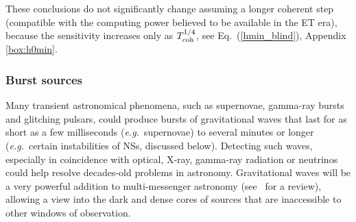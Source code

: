 These conclusions do not significantly change assuming a
longer coherent step (compatible with the computing power believed to be
available in the ET era), because the sensitivity increases only as
$T_{\rm coh}^{1/4}$, see Eq.~(\ref{hmin_blind}), Appendix \ref{box:h0min}.




\FloatBarrier

\subsubsection{Burst sources}
Many transient astronomical phenomena, such as supernovae, gamma-ray
bursts and glitching pulsars, could produce bursts of gravitational 
waves that last for as short as a few milliseconds (\emph{e.g.}\ supernovae)
to several minutes or longer (\emph{e.g.}\ certain instabilities of NSs, 
discussed below). Detecting such waves, especially in coincidence with optical, 
X-ray, gamma-ray radiation or neutrinos could help resolve decades-old 
problems in astronomy. Gravitational waves will be a very powerful 
addition to multi-messenger astronomy (see~\cite{springerlink:10.1007/s10714-010-1019-z} for a review),  allowing a view into the dark and 
dense cores of sources that are inaccessible to other windows of 
observation.

